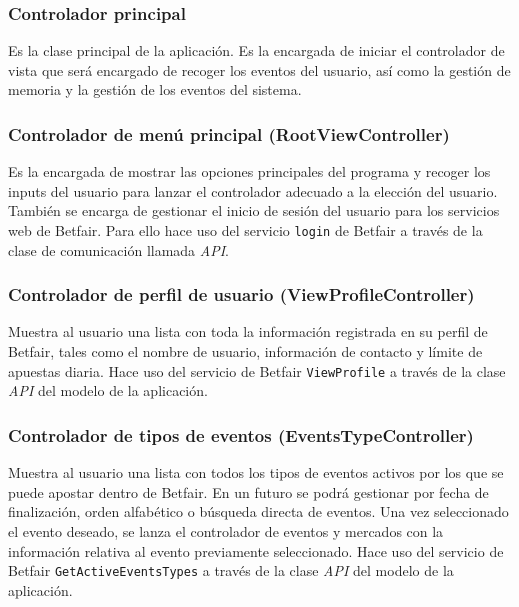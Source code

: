    
    
\subsubsection{Controlador principal}

 Es la clase principal de la aplicación. Es la encargada de iniciar el controlador de vista que será encargado de recoger los eventos del usuario, así como la gestión de memoria y la gestión de los eventos del sistema.
 
\subsubsection{Controlador de menú principal (RootViewController)}
 Es la encargada de mostrar las opciones principales del programa y recoger los inputs del usuario para lanzar el controlador adecuado a la elección del usuario. También se encarga de gestionar el inicio de sesión del usuario para los servicios web de Betfair. Para ello hace uso del servicio \lstinline{login} de Betfair a través de la clase de comunicación llamada \emph{API}.
 
 \subsubsection{Controlador de perfil de usuario (ViewProfileController)}
 Muestra al usuario una lista con toda la información registrada en su perfil de Betfair, tales como el nombre de usuario, información de contacto y límite de apuestas diaria. Hace uso del servicio de Betfair \lstinline{ViewProfile}  a través de la clase \emph{API} del modelo de la aplicación.
 
\subsubsection{Controlador de tipos de eventos (EventsTypeController)}
 Muestra al usuario una lista con todos los tipos de eventos activos por los que se puede apostar dentro de Betfair. En un futuro se podrá gestionar por fecha de finalización, orden alfabético o búsqueda directa de eventos. Una vez seleccionado el evento deseado, se lanza el controlador de eventos y mercados con la información relativa al evento previamente seleccionado. Hace uso del servicio de Betfair \lstinline{GetActiveEventsTypes}  a través de la clase \emph{API} del modelo de la aplicación.
 

